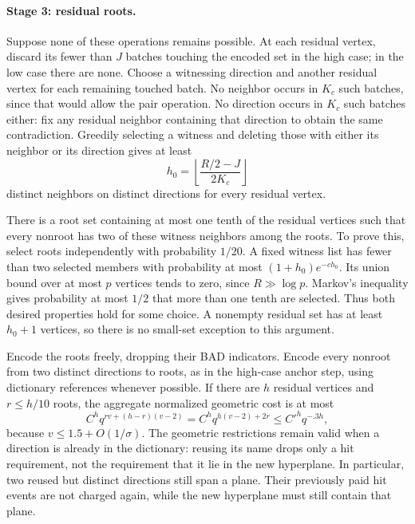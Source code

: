 \paragraph{Stage 3: residual roots.}
Suppose none of these operations remains possible.  At each residual
vertex, discard its fewer than \(J\) batches touching the encoded set
in the high case; in the low case there are none.  Choose a witnessing
direction and another residual vertex for each remaining touched batch.
No neighbor occurs in \(K_c\) such batches, since that would allow the
pair operation.  No direction occurs in \(K_c\) such batches either:
fix any residual neighbor containing that direction to obtain the same
contradiction.  Greedily selecting a witness and deleting those with
either its neighbor or its direction gives at least
\[
 h_0=\left\lfloor\frac{R/2-J}{2K_c}\right\rfloor
\]
distinct neighbors on distinct directions for every residual vertex.

There is a root set containing at most one tenth of the residual
vertices such that every nonroot has two of these witness neighbors
among the roots.  To prove this, select roots independently with
probability \(1/20\).  A fixed witness list has fewer than two selected
members with probability at most \((1+h_0)e^{-ch_0}\).  Its union bound
over at most \(p\) vertices tends to zero, since \(R\gg\log p\).
Markov's inequality gives probability at most \(1/2\) that more than one
tenth are selected.  Thus both desired properties hold for some choice.
A nonempty residual set has at least \(h_0+1\) vertices, so there is no
small-set exception to this argument.

Encode the roots freely, dropping their BAD indicators.  Encode every
nonroot from two distinct directions to roots, as in the high-case
anchor step, using dictionary references whenever possible.  If there
are \(h\) residual vertices and \(r\le h/10\) roots, the aggregate
normalized geometric cost is at most
\begin{equation}
 C^h q^{rv+(h-r)(v-2)}
 =C^h q^{h(v-2)+2r}\le C'^h q^{-.3h},
 \label{eq:root-cancellation}
\end{equation}
because \(v\le1.5+O(1/\sigma)\).  The geometric restrictions remain valid
when a direction is already in the dictionary: reusing its name drops
only a hit requirement, not the requirement that it lie in the new
hyperplane.  In particular, two reused but distinct directions still
span a plane.  Their previously paid hit events are not charged again,
while the new hyperplane must still contain that plane.

